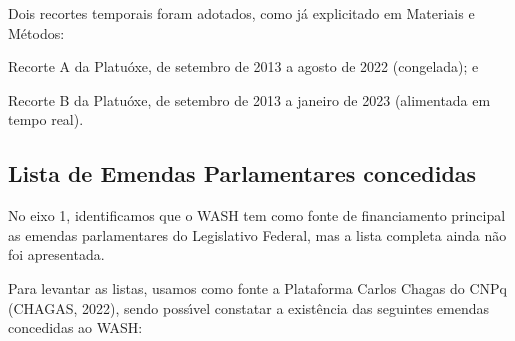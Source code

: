 \documentclass[
12pt,		%
openright,	%
twoside,  %
a4paper,			%
chapter=TITLE,		%
english,			%
french,				%
spanish,			%
brazil				%
]{USPSC-classe/USPSC}
\begin{document}
Dois recortes temporais foram adotados, como j\'a explicitado em Materiais e M\'etodos:










\begin{alineas}
\item Recorte A da Platu\'oxe, de setembro de 2013 a agosto de 2022 (congelada); e
\item Recorte B da Platu\'oxe, de setembro de 2013 a janeiro de 2023 (alimentada em tempo real).
\end{alineas}

\subsection[Lista de Emendas Parlamentares concedidas]{Lista de Emendas Parlamentares concedidas}\label{Lista de Emendas Parlamentares concedidas}
No eixo 1, identificamos que o WASH tem como fonte de financiamento principal as emendas parlamentares do Legislativo Federal, mas a lista completa ainda n\~ao foi apresentada.









Para levantar as listas, usamos como fonte a Plataforma Carlos Chagas do CNPq (CHAGAS, 2022), sendo poss\'{\i}vel constatar a exist\^encia das seguintes emendas concedidas ao WASH:
\end{document}
